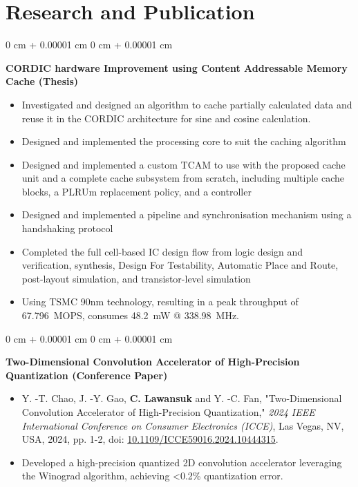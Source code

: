 \documentclass[10pt, a4paper]{article}
\newcommand{\doi}{10.1109/ICCE59016.2024.10444315}
\newcommand{\doilink}{https://doi.org/\doi}
\newenvironment{highlights}{
    \begin{itemize}[
        topsep=0.10 cm,
        parsep=0.10 cm,
        partopsep=0pt,
        itemsep=0pt,
        leftmargin=0 cm + 10pt
    ]
}{
    \end{itemize}
} %
\newenvironment{onecolentry}{
    \begin{adjustwidth}{
        0 cm + 0.00001 cm
    }{
        0 cm + 0.00001 cm
    }
}{
    \end{adjustwidth}
} %
\let\hrefWithoutArrow\href
\begin{document}
\section{Research and Publication}

\begin{onecolentry}
	\textbf{CORDIC hardware Improvement using Content Addressable Memory Cache (Thesis)}
	\begin{highlights}
		\item Investigated and designed an algorithm to cache partially calculated data and reuse it in the CORDIC architecture for sine and cosine calculation.
		\item Designed and implemented the processing core to suit the caching algorithm
		\item Designed and implemented a custom TCAM to use with the proposed cache unit and a complete cache subsystem from scratch, including multiple cache blocks, a PLRUm replacement policy, and a controller
		\item Designed and implemented a pipeline and synchronisation mechanism using a handshaking protocol
		\item Completed the full cell-based IC design flow from logic design and verification, synthesis, Design For Testability, Automatic Place and Route, post-layout simulation, and transistor-level simulation
		\item Using TSMC 90nm technology, resulting in a peak throughput of 67.796~MOPS, consumes 48.2~mW @ 338.98~MHz.
	\end{highlights}
\end{onecolentry}
\vspace{0.10 cm}

\begin{onecolentry}
	\textbf{Two-Dimensional Convolution Accelerator of High-Precision Quantization (Conference Paper)}

	\begin{highlights}
		\item Y. -T. Chao, J. -Y. Gao, \textbf{C. Lawansuk} and Y. -C. Fan, "Two-Dimensional Convolution Accelerator
		of High-Precision Quantization,"
		\textit{2024 IEEE International Conference on Consumer Electronics (ICCE)}, Las Vegas, NV, USA, 2024, pp. 1-2, doi: \hrefWithoutArrow{\doilink}{10.1109/ICCE59016.2024.10444315}.
		\item Developed a high-precision quantized 2D convolution accelerator leveraging the Winograd algorithm, achieving <0.2\% quantization error.
	\end{highlights}
\end{onecolentry}
\end{document}
